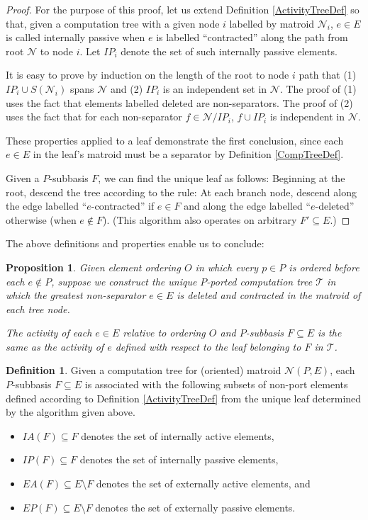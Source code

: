 \documentclass[12pt]{article}
\newtheorem{proposition}[theorem]{Proposition}
\theoremstyle{definition}
\newtheorem{definition}[theorem]{Definition}
\begin{document}
\begin{proof}
For the purpose of this proof, let us extend Definition \ref{ActivityTreeDef}
so that, given a computation tree with a given node $i$ 
labelled by matroid $\mathcal{N}_i$,
$e\in E$ is called internally passive when $e$ is labelled 
``contracted'' along the path from root $\mathcal{N}$ to
node $i$.  Let $IP_i$ denote the set of such internally passive 
elements.

It is easy to prove by induction on the length of the root to node $i$ path
that
(1) $IP_i\cup S(\mathcal{N}_i)$ spans $\mathcal{N}$ and 
(2) $IP_i$ is an independent set in $\mathcal{N}$.  The proof
of (1) uses the fact that elements labelled deleted are non-separators.  The
proof of (2) uses the fact that for each non-separator 
$f\in\mathcal{N}/IP_i$, $f\cup IP_i$ is independent in $\mathcal{N}$.

These properties applied to a leaf demonstrate the first conclusion,
since each $e\in E$ in the leaf's matroid must be a separator by Definition 
\ref{CompTreeDef}.

Given a $P$-subbasis $F$, we can find the unique leaf as follows: Beginning
at the root, descend the tree according to the rule: At each branch node,
descend along the edge labelled ``$e$-contracted'' if $e\in F$ and along
the edge labelled ``$e$-deleted'' otherwise (when $e\not\in F$).
(This algorithm also operates on arbitrary $F'\subseteq E$.)
\end{proof}

The above definitions and properties enable us to conclude:
\begin{proposition}
Given element ordering $O$ in which every $p\in P$ is ordered
before each $e\not\in P$, suppose we construct the unique $P$-ported
computation tree $\mathcal{T}$ in which the greatest non-separator $e\in E$ is
deleted and contracted in the matroid of each tree node.

The activity of each $e\in E$ relative to ordering $O$ and
$P$-subbasis $F\subseteq E$ is the same as the activity
of $e$ defined with respect to the leaf 
belonging to $F$ in $\mathcal{T}$.
\end{proposition}

\begin{definition}
\label{ActivitySymbolsDef}
Given a computation tree for 
(oriented) matroid $\mathcal{N}(P,E)$,
each $P$-subbasis $F\subseteq E$
is associated with the following subsets of non-port elements
defined according to Definition \ref{ActivityTreeDef}
from the unique leaf determined by the algorithm given above.
\begin{itemize}
\item $IA(F)\subseteq F$ denotes the set of internally active elements,
\item $IP(F)\subseteq F$ denotes the set of internally passive elements,
\item $EA(F)\subseteq E\setminus F$ 
denotes the set of externally active elements,
and 
\item $EP(F)\subseteq E\setminus F$ denotes the set of externally
passive elements.
\end{itemize}
\end{definition}
\end{document}
